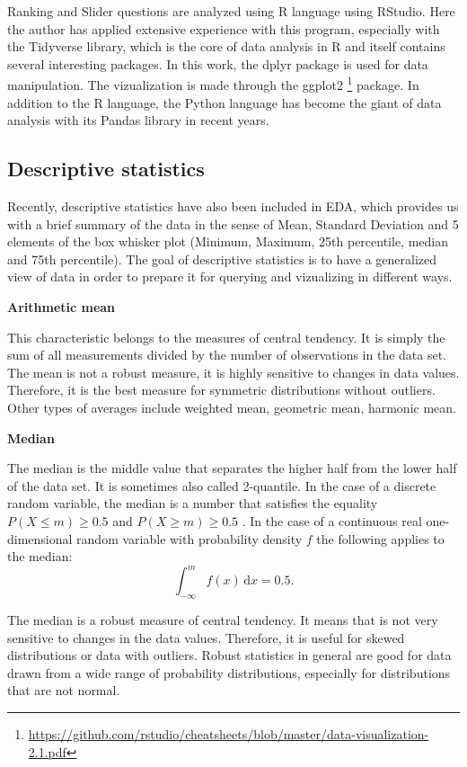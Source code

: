 \documentclass[a4paper,10pt,twoside]{article}
\begin{document}
Ranking and Slider questions are analyzed using R language using RStudio. Here the author has applied extensive experience with this program, especially with the Tidyverse library, which is the core of data analysis in R and itself contains several interesting packages. In this work, the dplyr package is used for data manipulation. The vizualization is made through the ggplot2 \footnote{\url{https://github.com/rstudio/cheatsheets/blob/master/data-visualization-2.1.pdf}} package. In addition to the R language, the Python language has become the giant of data analysis with its Pandas library in recent years.

\subsection{Descriptive statistics}

Recently, descriptive statistics have also been included in EDA, which provides us with a brief summary of the data in the sense of Mean, Standard Deviation and 5 elements of the box whisker plot (Minimum, Maximum, 25th percentile, median and 75th percentile). The goal of descriptive statistics is to have a generalized view of data in order to prepare it for querying and vizualizing in different ways.

\smallskip
\noindent \textbf{Arithmetic mean}
\smallskip

\noindent This characteristic belongs to the measures of central tendency. It is simply the sum of all measurements divided by the number of observations in the data set. The mean is not a robust measure, it is highly sensitive to changes in data values. Therefore, it is the best measure for symmetric distributions without outliers. Other types of averages include weighted mean, geometric mean, harmonic mean.

\smallskip
\noindent \textbf{Median}
\smallskip

\noindent The median is the middle value that separates the higher half from the lower half of the data set. It is sometimes also called 2-quantile. In the case of a discrete random variable, the median is a number that satisfies the equality $ P(X \leq m) \geq 0.5$ and $P(X \geq m) \geq 0.5$ . In the case of a continuous real one-dimensional random variable with probability density $f$ the following applies to the median:
$$
\int_{-\infty}^{m} f(x)\, \mathrm{d}x = 0.5.
$$    

\noindent The median is a robust measure of central tendency. It means that is not very sensitive to changes in the data values. Therefore, it is useful for skewed distributions or data with outliers. Robust statistics in general are good for data drawn from a wide range of probability distributions, especially for distributions that are not normal.
 
\end{document}
